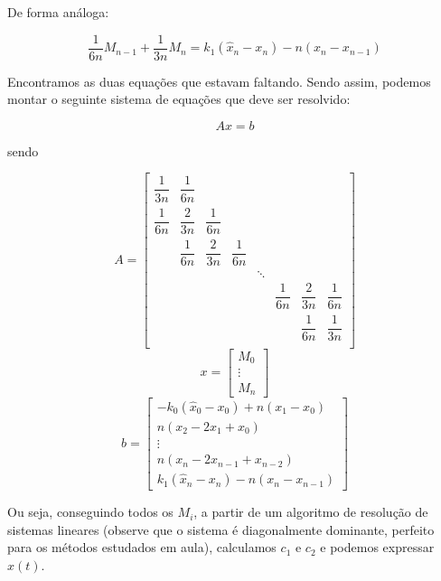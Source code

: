 \documentclass{article}
\begin{document}
\begin{enumerate}
\begin{enumerate}
                    De forma análoga:

                    $$\dfrac{1}{6n}M_{n-1} + \dfrac{1}{3n}M_n = k_1 (\hat{x}_n - x_n) - n(x_n - x_{n-1})$$

                    Encontramos as duas equações que estavam faltando. Sendo assim, podemos montar o seguinte
                    sistema de equações que deve ser resolvido:

                    $$Ax = b$$

                    sendo

                    $$A = \begin{bmatrix}
                        \dfrac{1}{3n} & \dfrac{1}{6n}  \\[6pt]
                        \dfrac{1}{6n} & \dfrac{2}{3n} & \dfrac{1}{6n}  \\[6pt]
                        & \dfrac{1}{6n} & \dfrac{2}{3n} & \dfrac{1}{6n}  \\[6pt]
                        & & & & \ddots \\[6pt]
                        & & & & & \dfrac{1}{6n} & \dfrac{2}{3n} & \dfrac{1}{6n}  \\[6pt]
                        & & & & & & \dfrac{1}{6n} & \dfrac{1}{3n}  \\[6pt]
                        \end{bmatrix}$$
                    $$x = \begin{bmatrix}
                            M_0 \\
                            \vdots \\
                            M_n
                        \end{bmatrix}$$
                    $$b = \begin{bmatrix}
                            -k_0(\hat{x}_0 - x_0) + n(x_1 - x_0) \\
                            n(x_{2} - 2x_1 + x_{0}) \\
                            \vdots \\
                            n(x_n - 2x_{n-1} + x_{n-2}) \\
                            k_1 (\hat{x}_n - x_n) - n(x_n - x_{n-1})
                        \end{bmatrix}$$

                    Ou seja, conseguindo todos os $M_i$, a partir de um algoritmo
                    de resolução de sistemas lineares (observe que o sistema
                    é diagonalmente dominante, perfeito para os métodos estudados
                    em aula), calculamos $c_1$ e $c_2$ e podemos
                    expressar $x(t)$.


\end{enumerate}
\end{enumerate}
\end{document}
